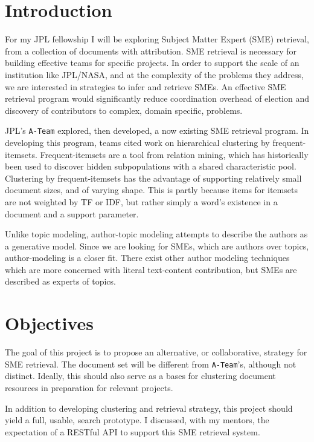 \documentclass{article}
\begin{document}
\begin{multicols}{2}

\section{Introduction}

For my JPL fellowship I will be exploring Subject Matter Expert (SME) retrieval,
from a collection of documents with attribution. SME retrieval is necessary for
building effective teams for specific projects. In order to support the scale of an
institution like JPL/NASA, and at the complexity of the problems they address, we are
interested in strategies to infer and retrieve SMEs. An effective SME retrieval program
would significantly reduce coordination overhead of election and discovery of
contributors to complex, domain specific, problems.

JPL's \texttt{A-Team} explored, then developed, a now existing SME retrieval program.
In developing this program, teams cited work on hierarchical clustering by
frequent-itemsets\cite{wang2003,kiran2010}. Frequent-itemsets\cite{Agrawal1993} are a
tool from relation mining, which has historically been used to discover hidden
subpopulations with a shared characteristic pool. Clustering by frequent-itemsets has the
advantage of supporting relatively small document sizes, and of varying shape. This is
partly because items for itemsets are not weighted by TF or IDF, but rather simply
a word's existence in a document and a support parameter.

Unlike topic modeling, author-topic modeling attempts to describe the authors as
a generative model. Since we are looking for SMEs, which are authors over topics,
author-modeling is a closer fit. There exist other author modeling techniques\cite{Rexha2018}
which are more concerned with literal text-content contribution, but SMEs are
described as experts of topics.

\section{Objectives}

The goal of this project is to propose an alternative, or collaborative, strategy for
SME retrieval. The document set will be different from \texttt{A-Team}'s, although
not distinct. Ideally, this should also serve as a bases for clustering document
resources in preparation for relevant projects.

In addition to developing clustering and retrieval strategy, this project should yield
a full, usable, search prototype. I discussed, with my mentors, the expectation of a
RESTful API to support this SME retrieval system.


\end{multicols}
\end{document}
